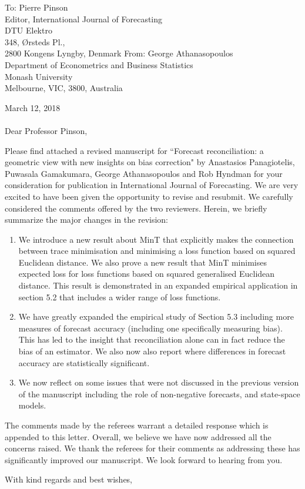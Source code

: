 \documentclass[11pt,a4paper]{letter}
\date{}
\begin{document}
 \begin{letter}{To: Pierre Pinson\\
 	Editor, International Journal of Forecasting\\
 	DTU Elektro\\
 	348, {\O}rsteds Pl., \\
 	2800 Kongens Lyngby, Denmark}
    From: George Athanasopoulos\\
    Department of Econometrics and Business Statistics\\
    Monash University\\
    Melbourne, VIC, 3800, Australia
 
 \opening{ March 12, 2018\\ \\Dear Professor Pinson,}
 \medskip

Please find attached a revised manuscript for ``Forecast reconciliation: a geometric view with new insights on bias correction" by Anastasios Panagiotelis, Puwasala Gamakumara, George Athanasopoulos and Rob Hyndman for your consideration for publication in International Journal of Forecasting. We are very excited to have been given the opportunity to revise and resubmit. We carefully considered the comments offered by the two reviewers. Herein, we briefly summarize the major changes in the revision:
\begin{enumerate}
	\item We introduce a new result about MinT that explicitly makes the connection between trace minimisation and minimising a loss function based on squared Euclidean distance.  We also prove a new result that MinT minimises expected loss for loss functions based on squared generalised Euclidean distance.  This result is demonstrated in an expanded empirical application in section 5.2 that includes a wider range of loss functions. 
	\item We have greatly expanded the empirical study of Section 5.3 including more measures of forecast accuracy (including one specifically measuring bias).  This has led to the insight that reconciliation alone can in fact reduce the bias of an estimator.  We also now also report where differences in forecast accuracy are statistically significant.
	\item We now reflect on some issues that were not discussed in the previous version of the manuscript including the role of non-negative forecasts, and state-space models. 
\end{enumerate}

The comments made by the referees warrant a detailed response which is appended to this letter. Overall, we believe we have now addressed all the concerns raised. We thank the referees for their comments as addressing these has significantly improved our manuscript. We look forward to hearing from you.

 \closing{With kind regards and best wishes,}

 \end{letter}
\end{document}
